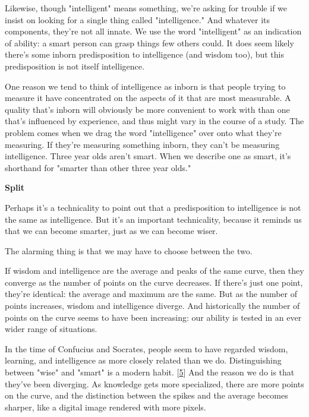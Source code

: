 Likewise, though "intelligent" means something,
                  we're asking for trouble if we insist on looking for a single
                  thing called "intelligence." And whatever its components,
                  they're not all innate. We use the word "intelligent" as an
                  indication of ability: a smart person can grasp things few
                  others could. It does seem likely there's some inborn
                  predisposition to intelligence (and wisdom too), but this
                  predisposition is not itself intelligence.

One
                  reason we tend to think of intelligence as inborn is that
                  people trying to measure it have concentrated on the aspects
                  of it that are most measurable. A quality that's inborn will
                  obviously be more convenient to work with than one that's
                  influenced by experience, and thus might vary in the course of
                  a study. The problem comes when we drag the word
                  "intelligence" over onto what they're measuring. If they're
                  measuring something inborn, they can't be measuring
                  intelligence. Three year olds aren't smart. When we describe
                  one as smart, it's shorthand for "smarter than other three
                  year olds."

\textbf{Split}

Perhaps it's a
                  technicality to point out that a predisposition to
                  intelligence is not the same as intelligence. But it's an
                  important technicality, because it reminds us that we can
                  become smarter, just as we can become wiser.

The
                  alarming thing is that we may have to choose between the
                  two.

If wisdom and intelligence are the average and
                  peaks of the same curve, then they converge as the number of
                  points on the curve decreases. If there's just one point,
                  they're identical: the average and maximum are the same. But
                  as the number of points increases, wisdom and intelligence
                  diverge. And historically the number of points on the curve
                  seems to have been increasing: our ability is tested in an
                  ever wider range of situations.

In the time of
                  Confucius and Socrates, people seem to have regarded wisdom,
                  learning, and intelligence as more closely related than we do.
                  Distinguishing between "wise" and "smart" is a modern habit.
                  [\href{\#f5n}{5}]
                  And the reason we do is that they've been diverging. As
                  knowledge gets more specialized, there are more points on the
                  curve, and the distinction between the spikes and the average
                  becomes sharper, like a digital image rendered with more
                  pixels.

